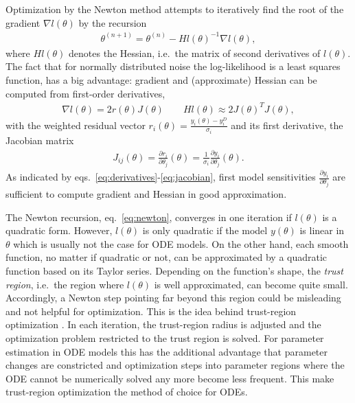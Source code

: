 \documentclass[article]{jss}
\begin{document}
Optimization by the Newton method attempts to iteratively find the root of the gradient $\nabla l (\theta)$ by the recursion
\begin{align}
	\theta^{(n+1)} = \theta^{(n)} - Hl(\theta)^{-1}\nabla l(\theta),
	\label{eq:newton}
\end{align}
where $Hl(\theta)$ denotes the Hessian, i.e.~the matrix of second derivatives of $l(\theta)$. The fact that for normally distributed noise the log-likelihood is a least squares function, has a big advantage: gradient and (approximate) Hessian can be computed from first-order derivatives,
\begin{align}
	\nabla l(\theta) = 2 r(\theta) J(\theta) \quad\quad Hl(\theta) \approx 2 J(\theta)^T J(\theta),
	\label{eq:derivatives}
\end{align}
with the weighted residual vector $r_i(\theta) = \frac{y_i(\theta) - y_i^D}{\sigma_i}$ and its first derivative, the Jacobian matrix 
\begin{align}
	J_{ij}(\theta) = \frac{\partial r_i}{\partial \theta_j}(\theta) = \frac{1}{\sigma_i} \frac{\partial y_i}{\partial \theta_j}(\theta). \label{eq:jacobian}
\end{align}
As indicated by eqs.~\eqref{eq:derivatives}-\eqref{eq:jacobian},  first model sensitivities $\frac{\partial y_i}{\partial\theta_j}$ are sufficient to compute gradient and Hessian in good approximation.

The Newton recursion, eq.~\eqref{eq:newton}, converges in one iteration if $l(\theta)$ is a quadratic form. However, $l(\theta)$ is only quadratic if the model $y(\theta)$ is linear in $\theta$ which is usually not the case for ODE models. On the other hand, each smooth function, no matter if quadratic or not, can be approximated by a quadratic function based on its Taylor series. Depending on the function's shape, the \textit{trust region}, i.e.~the region where $l(\theta)$ is well approximated, can become quite small. Accordingly, a Newton step pointing far beyond this region could be misleading and not helpful for optimization. This is the idea behind trust-region optimization \citep{wright1999numerical}. In each iteration, the trust-region radius is adjusted and the optimization problem restricted to the trust region is solved. For parameter estimation in ODE models this has the additional advantage that parameter changes are constricted and optimization steps into parameter regions where the ODE cannot be numerically solved any more  become less frequent. This make trust-region optimization the method of choice for ODEs.
\end{document}
